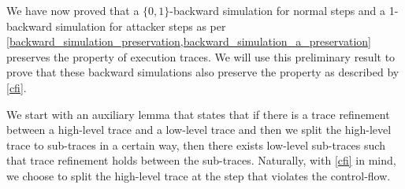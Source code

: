 We have now proved that a $\lbrace 0,1 \rbrace$-backward simulation
for normal steps and a 1-backward simulation for attacker steps as per
\cref{backward_simulation_preservation,backward_simulation_a_preservation}
preserves the \CFI property of execution traces. We will use this
preliminary result to prove that these backward simulations also
preserve the \CFI property as described by \cref{cfi}.

We start with an auxiliary lemma that states that if there is a trace
refinement between a high-level trace and a low-level trace and then
we split the high-level trace to sub-traces in a certain way, then
there exists low-level sub-traces such that trace refinement holds
between the sub-traces. Naturally, with \cref{cfi} in mind, we choose to split
the high-level trace at the step that violates the control-flow.

